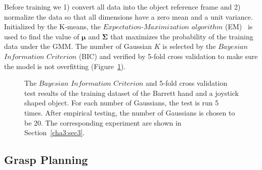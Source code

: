 Before training we 1) convert all data into the object reference frame and 2) normalize the data so that all dimensions have a zero mean and a unit variance. Initialized by the K-means, the $Expectation$-$Maximization$ $algorithm$ (EM)~\citep{dempster1977maximum} is used to find the value of $\boldsymbol\mu$ and $\boldsymbol\Sigma$ that maximizes the probability of the training data under the GMM. The number of Gaussian $K$ is selected by the $Bayesian$ $Information$ $Criterion$ (BIC) and verified by 5-fold cross validation to make sure the model is not overfitting (Figure~\ref{bicxv}).

\begin{figure}
  \centering

  \caption{\scriptsize{The $Bayesian$ $Information$ $Criterion$ and 5-fold cross validation test results of the training dataset of the Barrett hand and a joystick shaped object. For each number of Gaussians, the test is run 5 times. After empirical testing, the number of Gaussians is chosen to be 20. The corresponding experiment are shown in Section~\ref{cha3:sec3}.}
}
    \label{bicxv}
\end{figure}

\subsection{Grasp Planning}
\label{cha3:sec2:plangrasp}

